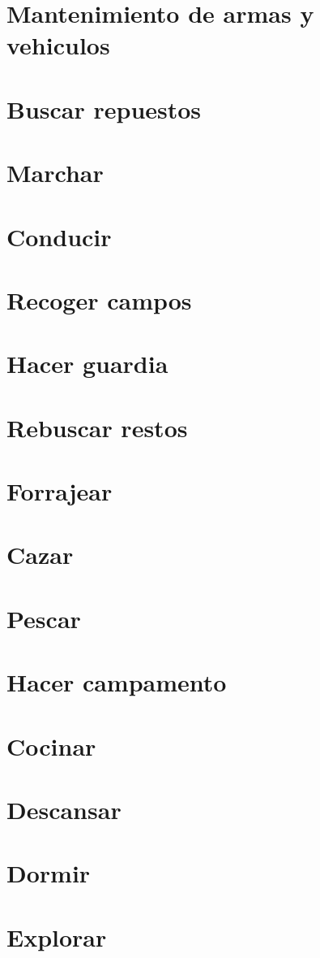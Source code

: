 \section{Mantenimiento de armas y vehiculos}

\section{Buscar repuestos}

\section{Marchar}

\section{Conducir}

\section{Recoger campos}

\section{Hacer guardia}

\section{Rebuscar restos}

\section{Forrajear}

\section{Cazar}

\section{Pescar}

\section{Hacer campamento}

\section{Cocinar}

\section{Descansar}

\section{Dormir}

\section{Explorar}
